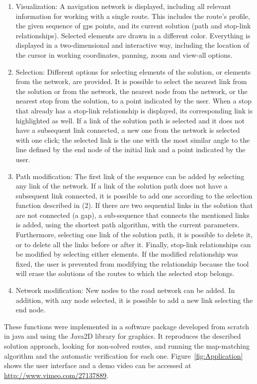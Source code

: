 \begin{enumerate}\styleEnumerate
\item Visualization: A navigation network is displayed, including all relevant information for working with a single route. This includes the route's profile, the given sequence of \gls{gps} points, and its current solution (path and stop-link relationships). Selected elements are drawn in a different color. Everything is displayed in a two-dimensional and interactive way, including the location of the cursor in working coordinates, panning, zoom and view-all options.
%
\item Selection: Different options for selecting elements of the solution, or elements from the network, are provided. It is possible to select the nearest link from the solution or from the network, the nearest node from the network, or the nearest stop from the solution, to a point indicated by the user. When a stop that already has a stop-link relationship is displayed, its corresponding link is highlighted as well. If a link of the solution path is selected and it does not have a subsequent link connected, a new one from the network is selected with one click; the selected link is the one with the most similar angle to the line defined by the end node of the initial link and a point indicated by the user.
%
\item Path modification: The first link of the sequence can be added by selecting any link of the network. If a link of the solution path does not have a subsequent link connected, it is possible to add one according to the selection function described in (2). If there are two sequential links in the solution that are not connected (a gap), a sub-sequence that connects the mentioned links is added, using the shortest path algorithm, with the current parameters. Furthermore, selecting one link of the solution path, it is possible to delete it, or to delete all the links before or after it. Finally, stop-link relationships can be modified by selecting either elements. If the modified relationship was fixed, the user is prevented from modifying the relationship because the tool will erase the solutions of the routes to which the selected stop belongs.
%
\item Network modification: New nodes to the road network can be added. In addition, with any node selected, it is possible to add a new link selecting the end node.
\end{enumerate}

These functions were implemented in a software package developed from scratch in \gls{java} and using the Java2D library for graphics. It reproduces the described solution approach, looking for non-solved routes, and running the map-matching algorithm and the automatic verification for each one. Figure~\ref{fig:Application} shows the user interface and a demo video can be accessed at \url{http://www.vimeo.com/27137889}.

